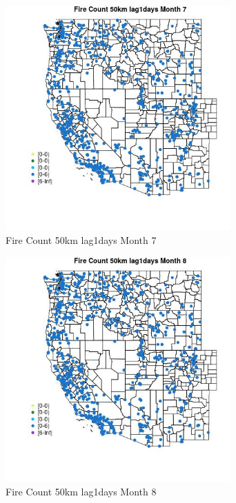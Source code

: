 \begin{figure} 
\centering  
\includegraphics[width=0.77\textwidth]{Code_Outputs/Report_ML_input_PM25_Step4_part_e_de_duplicated_aves_compiled_2019-05-21wNAs_MapObsMo7Fire_Count_50km_lag1days.jpg} 
\caption{\label{fig:Report_ML_input_PM25_Step4_part_e_de_duplicated_aves_compiled_2019-05-21wNAsMapObsMo7Fire_Count_50km_lag1days}Fire Count 50km lag1days Month 7} 
\end{figure} 
 

\clearpage 

\begin{figure} 
\centering  
\includegraphics[width=0.77\textwidth]{Code_Outputs/Report_ML_input_PM25_Step4_part_e_de_duplicated_aves_compiled_2019-05-21wNAs_MapObsMo8Fire_Count_50km_lag1days.jpg} 
\caption{\label{fig:Report_ML_input_PM25_Step4_part_e_de_duplicated_aves_compiled_2019-05-21wNAsMapObsMo8Fire_Count_50km_lag1days}Fire Count 50km lag1days Month 8} 
\end{figure} 
 


